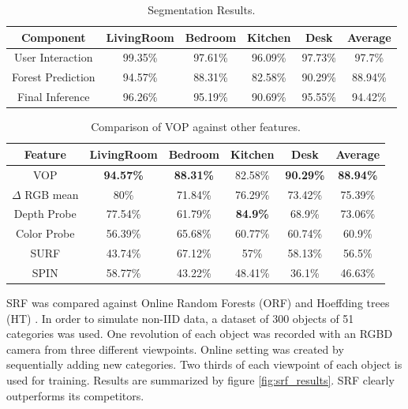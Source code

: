 \documentclass{llncs}
\begin{document}
  
\begin{table}[!ht]	
 \center
 \caption{Segmentation Results.}
 \begin{tabular}{c|c|c|c|c|c}
  \textbf{Component} & \textbf{LivingRoom} & \textbf{Bedroom} & \textbf{Kitchen} & \textbf{Desk} & \textbf{Average} \\ \hline
  User Interaction & 99.35\% & 97.61\% & 96.09\% & 97.73\% & 97.7\% \\ 
  Forest Prediction & 94.57\% & 88.31\% & 82.58\% & 90.29\% & 88.94\% \\
  Final Inference & 96.26\% & 95.19\% & 90.69\% & 95.55\% & 94.42\%
 \end{tabular}
 \label{fig:segm_results}
\end{table}


\begin{table}[!ht]	
 \center
 \caption{Comparison of VOP against other features.}
 \begin{tabular}{c|c|c|c|c|c}
  \textbf{Feature} & \textbf{LivingRoom} & \textbf{Bedroom} & \textbf{Kitchen} & \textbf{Desk} & \textbf{Average} \\ \hline
  VOP & \textbf{94.57\%} & \textbf{88.31\%} & 82.58\% & \textbf{90.29\%} & \textbf{88.94\%} \\
  $\Delta$ RGB mean & 80\% & 71.84\% & 76.29\% & 73.42\% & 75.39\% \\
  Depth Probe& 77.54\% & 61.79\% & \textbf{84.9\%} & 68.9\% & 73.06\% \\
  Color Probe& 56.39\% & 65.68\% & 60.77\% & 60.74\% & 60.9\% \\
  SURF & 43.74\% & 67.12\% & 57\% & 58.13\% & 56.5\% \\
  SPIN & 58.77\% & 43.22\% & 48.41\% & 36.1\% & 46.63\% \\
 \end{tabular}
 \label{fig:vop_results}
\end{table}

  SRF was compared against Online Random Forests (ORF) \cite{online_forest} and Hoeffding trees (HT) \cite{htree}. In order to simulate non-IID data, a dataset of 300 objects of 51 categories \cite{dataset} was used. One revolution of each object was recorded with an RGBD camera from three different viewpoints. Online setting was created by sequentially adding new categories. Two thirds of each viewpoint of each object is used for training. Results are summarized by figure \ref{fig:srf_results}. SRF clearly outperforms its competitors.
\end{document}
